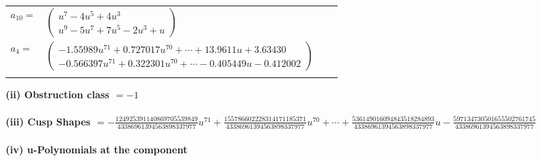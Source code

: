 \documentclass[1p]{elsarticle_modified}
\theoremstyle{definition}
\begin{document}
\begin{tabular}{m{7pt} m{180pt} m{7pt} m{180pt} }
\flushright $a_{10}=$&$\begin{pmatrix}u^7-4 u^5+4 u^3\\u^9-5 u^7+7 u^5-2 u^3+u\end{pmatrix}$ \\
\flushright $a_{4}=$&$\begin{pmatrix}-1.55989 u^{71}+0.727017 u^{70}+\cdots+13.9611 u+3.63430\\-0.566397 u^{71}+0.322301 u^{70}+\cdots-0.405449 u-0.412002\end{pmatrix}$\\&\end{tabular}
\flushleft \textbf{(ii) Obstruction class $= -1$}\\~\\
\flushleft \textbf{(iii) Cusp Shapes $= -\frac{124925391140869705539849}{43386961394563898337977} u^{71}+\frac{155786602228314171185371}{43386961394563898337977} u^{70}+\cdots+\frac{536149016094843518284893}{43386961394563898337977} u-\frac{597134730501655502761745}{43386961394563898337977}$}\\~\\
\newpage\renewcommand{\arraystretch}{1}
\flushleft \textbf{(iv) u-Polynomials at the component}\newline \\
\end{document}
